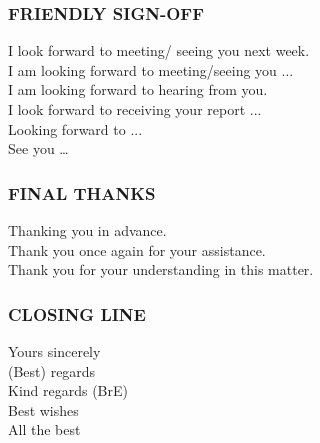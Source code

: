 \subsubsection{FRIENDLY SIGN-OFF}
I look forward to meeting/ seeing you next week.\\
I am looking forward to meeting/seeing you ...\\
I am looking forward to hearing from you.\\
I look forward to receiving your report ...\\
Looking forward to ...\\
See you …\\
\subsubsection{FINAL THANKS}
Thanking you in advance.\\
Thank you once again for your assistance.\\
Thank you for your understanding in this matter.\\
\subsubsection{CLOSING LINE}
Yours sincerely\\
(Best) regards\\
Kind regards (BrE)\\
Best wishes\\
All the best\\